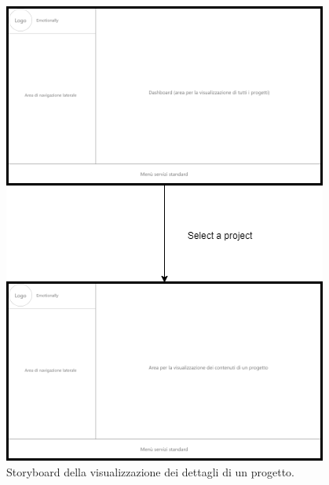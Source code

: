 \begin{figure}[H]
	\centering
	\caption{Storyboard della visualizzazione dei dettagli di un progetto.}
	\label{fig:storyboard:project}
	\includegraphics[height=\textheight-3ex]{images/storyboard/project}
\end{figure}

